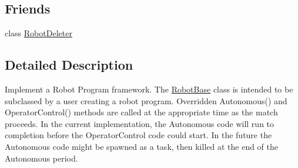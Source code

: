 \subsection*{Friends}
\begin{DoxyCompactItemize}
\item 
\hypertarget{classRobotBase_a09a160df094cc13bfc13d732ba175eb3}{
class \hyperlink{classRobotBase_a09a160df094cc13bfc13d732ba175eb3}{RobotDeleter}}
\label{classRobotBase_a09a160df094cc13bfc13d732ba175eb3}

\end{DoxyCompactItemize}


\subsection{Detailed Description}
Implement a Robot Program framework. The \hyperlink{classRobotBase}{RobotBase} class is intended to be subclassed by a user creating a robot program. Overridden Autonomous() and OperatorControl() methods are called at the appropriate time as the match proceeds. In the current implementation, the Autonomous code will run to completion before the OperatorControl code could start. In the future the Autonomous code might be spawned as a task, then killed at the end of the Autonomous period. 

